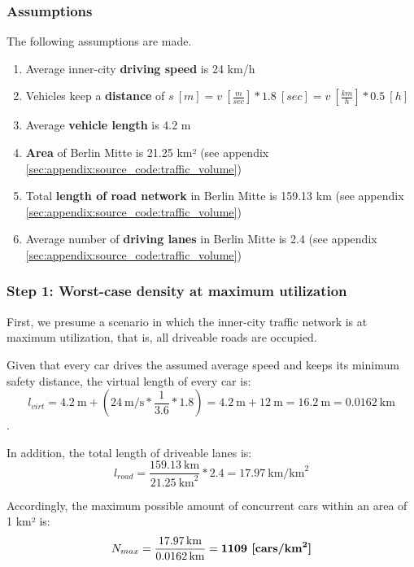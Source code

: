 \subsubsection{Assumptions}
The following assumptions are made.

\begin{samepage}
\begin{enumerate}
	\item Average inner-city \textbf{driving speed} is 24 km/h \cite{Forbes2008}
	\item Vehicles keep a \textbf{distance} of $s \ [m] = v \ [\frac{m}{sec}] * 1.8 \ [sec] = v \  [\frac{km}{h}] * 0.5 \ [h]$ \cite{wiki:sicherheitsabstand}
	\item Average \textbf{vehicle length} is 4.2 m
	\item \textbf{Area} of Berlin Mitte is 21.25 km² (see appendix \cref{sec:appendix:source_code:traffic_volume})
	\item Total \textbf{length of road network} in Berlin Mitte is 159.13 km (see appendix \cref{sec:appendix:source_code:traffic_volume})
	\item Average number of \textbf{driving lanes} in Berlin Mitte is 2.4 (see appendix \cref{sec:appendix:source_code:traffic_volume})
\end{enumerate}
\end{samepage}

\subsubsection{Step 1: Worst-case density at maximum utilization}
First, we presume a scenario in which the inner-city traffic network is at maximum utilization, that is, all driveable roads are occupied.

Given that every car drives the assumed average speed and keeps its minimum safety distance, the virtual length of every car is: $$l_{virt} = \SI{4.2}{\meter} + (\SI{24}{\meter\per\second} * \frac{1}{3.6} * 1.8) = \SI{4.2}{\meter} + \SI{12}{\meter} = \SI{16.2}{\meter} = \SI{0.0162}{\km}$$.

In addition, the total length of driveable lanes is:
$$l_{road} = \frac{\SI{159.13}{\km}}{\SI{21.25}{\square\km}} * 2.4 = \SI{17.97}{\km\per\square\km}$$

Accordingly, the maximum possible amount of concurrent cars within an area of 1 km² is:
$$N_{max} = \frac{\SI{17.97}{\km}}{\SI{0.0162}{\km}} = \textbf{1109 [\si[detect-weight]{cars\per\square\km}]}$$


